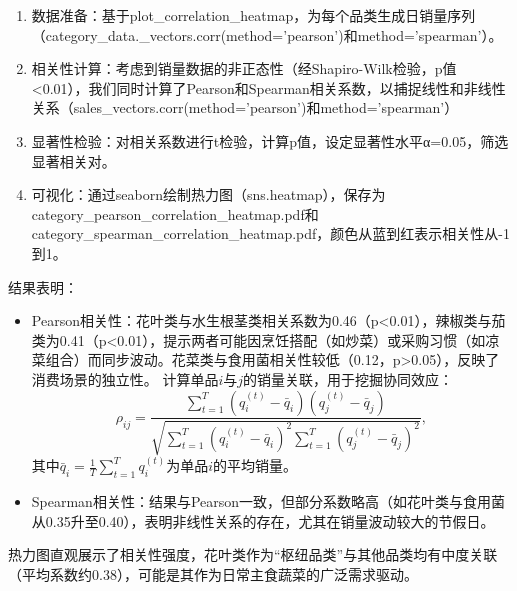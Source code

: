 \documentclass{cumcmthesis} %
\begin{document}
\begin{enumerate}
    

    \item 数据准备：基于plot\_correlation\_heatmap，为每个品类生成日销量序列（category\_data.\_vectors.corr(method='pearson')和method='spearman'）。
    
    \item 相关性计算：考虑到销量数据的非正态性（经Shapiro-Wilk检验，p值<0.01），我们同时计算了Pearson和Spearman相关系数，以捕捉线性和非线性关系（sales\_vectors.corr(method='pearson')和method='spearman'）
    
    \item 显著性检验：对相关系数进行t检验，计算p值，设定显著性水平α=0.05，筛选显著相关对。
    
    \item 可视化：通过seaborn绘制热力图（sns.heatmap），保存为category\_pearson\_correlation\_heatmap.pdf和category\_spearman\_correlation\_heatmap.pdf，颜色从蓝到红表示相关性从-1到1。

\end{enumerate}
结果表明：
\begin{itemize}
    \item Pearson相关性：花叶类与水生根茎类相关系数为0.46（p<0.01），辣椒类与茄类为0.41（p<0.01），提示两者可能因烹饪搭配（如炒菜）或采购习惯（如凉菜组合）而同步波动。花菜类与食用菌相关性较低（0.12，p>0.05），反映了消费场景的独立性。
            计算单品$i$与$j$的销量关联，用于挖掘协同效应：
            \begin{equation}
            \rho_{ij} = \frac{\sum_{t=1}^T (q_i^{(t)} - \bar{q}_i)(q_j^{(t)} - \bar{q}_j)}{\sqrt{\sum_{t=1}^T (q_i^{(t)} - \bar{q}_i)^2 \sum_{t=1}^T (q_j^{(t)} - \bar{q}_j)^2}},
            \end{equation}
            其中$\bar{q}_i = \frac{1}{T} \sum_{t=1}^T q_i^{(t)}$为单品$i$的平均销量。
    
    \item Spearman相关性：结果与Pearson一致，但部分系数略高（如花叶类与食用菌从0.35升至0.40），表明非线性关系的存在，尤其在销量波动较大的节假日。
    
\end{itemize}   

热力图直观展示了相关性强度，花叶类作为“枢纽品类”与其他品类均有中度关联（平均系数约0.38），可能是其作为日常主食蔬菜的广泛需求驱动。
\end{document}

